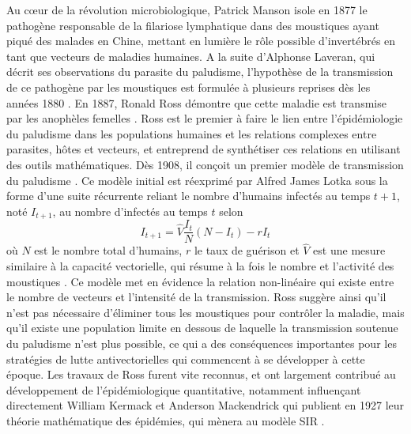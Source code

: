 Au c\oe ur de la révolution microbiologique, Patrick Manson isole en 1877 le pathogène responsable de la filariose lymphatique dans des moustiques ayant piqué des malades en Chine, mettant en lumière le rôle possible d'invertébrés en tant que vecteurs de maladies humaines. 
A la suite d'Alphonse Laveran, qui décrit ses observations du parasite du paludisme, l'hypothèse de la transmission de ce pathogène par les moustiques est formulée à plusieurs reprises dès les années 1880 \cite{ross1967researches}.
En 1887, Ronald Ross démontre que cette maladie est transmise par les anophèles femelles \cite{ross1897some}. 
Ross est le premier à faire le lien entre l'épidémiologie du paludisme dans les populations humaines et les relations complexes entre parasites, hôtes et vecteurs, et entreprend de synthétiser ces relations en utilisant des outils mathématiques.
Dès 1908, il conçoit un premier modèle de transmission du paludisme \cite{ross1908report}.
Ce modèle initial est réexprimé par Alfred James Lotka sous la forme d'une suite récurrente reliant le nombre d'humains infectés au temps $t+1$, noté $I_{t+1}$, au nombre d'infectés au temps $t$ selon
\begin{equation}
I_{t+1} = \hat{V}\frac{I_t}{N}(N-I_t)-rI_t
\end{equation}
où $N$ est le nombre total d'humains, $r$ le taux de guérison et $\hat{V}$ est une mesure similaire à la capacité vectorielle, qui résume à la fois le nombre et l'activité des moustiques \cite{lotka1923contribution}. 
Ce modèle met en évidence la relation non-linéaire qui existe entre le nombre de vecteurs et l'intensité de la transmission. 
Ross suggère ainsi qu'il n'est pas nécessaire d'éliminer tous les moustiques pour contrôler la maladie, mais qu'il existe une population limite en dessous de laquelle la transmission soutenue du paludisme n'est plus possible, ce qui a des conséquences importantes pour les stratégies de lutte antivectorielles qui commencent à se développer à cette époque.
Les travaux de Ross furent vite reconnus, et ont largement contribué au développement de l'épidémiologique quantitative, notamment influençant directement William Kermack et Anderson Mackendrick qui publient en 1927 leur théorie mathématique des épidémies, qui mènera au modèle SIR \cite{kermack1927contributions}.

